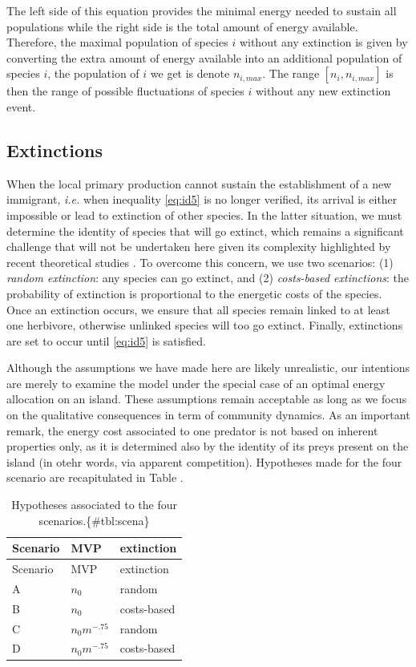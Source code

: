 The left side of this equation provides the minimal energy needed to
sustain all populations while the right side is the total amount of
energy available. Therefore, the maximal population of species \(i\)
without any extinction is given by converting the extra amount of energy
available into an additional population of species \(i\), the population
of \(i\) we get is denote \(n_{i,max}\). The range \([n_i, n_{i, max}]\)
is then the range of possible fluctuations of species \(i\) without any
new extinction event.

\subsection{Extinctions}\label{extinctions}

When the local primary production cannot sustain the establishment of a
new immigrant, \emph{i.e.} when inequality \ref{eq:id5} is no longer
verified, its arrival is either impossible or lead to extinction of
other species. In the latter situation, we must determine the identity
of species that will go extinct, which remains a significant challenge
that will not be undertaken here given its complexity highlighted by
recent theoretical studies \citep{Saterberg2013, Zhao2016}. To overcome
this concern, we use two scenarios: (1) \emph{random extinction}: any
species can go extinct, and (2) \emph{costs-based extinctions}: the
probability of extinction is proportional to the energetic costs of the
species. Once an extinction occurs, we ensure that all species remain
linked to at least one herbivore, otherwise unlinked species will too go
extinct. Finally, extinctions are set to occur until \ref{eq:id5} is
satisfied.

Although the assumptions we have made here are likely unrealistic, our
intentions are merely to examine the model under the special case of an
optimal energy allocation on an island. These assumptions remain
acceptable as long as we focus on the qualitative consequences in term
of community dynamics. As an important remark, the energy cost
associated to one predator is not based on inherent properties only, as
it is determined also by the identity of its preys present on the island
(in otehr words, via apparent competition). Hypotheses made for the four
scenario are recapitulated in Table \citet{tbl:scena}.

\begin{longtable}[]{@{}lll@{}}
\caption{Hypotheses associated to the four
scenarios.\{\#tbl:scena\}}\tabularnewline
\toprule
Scenario & MVP & extinction\tabularnewline
\midrule
\endfirsthead
\toprule
Scenario & MVP & extinction\tabularnewline
\midrule
\endhead
A & \(n_0\) & random\tabularnewline
B & \(n_0\) & costs-based\tabularnewline
C & \(n_0m^{-.75}\) & random\tabularnewline
D & \(n_0m^{-.75}\) & costs-based\tabularnewline
\bottomrule
\end{longtable}

